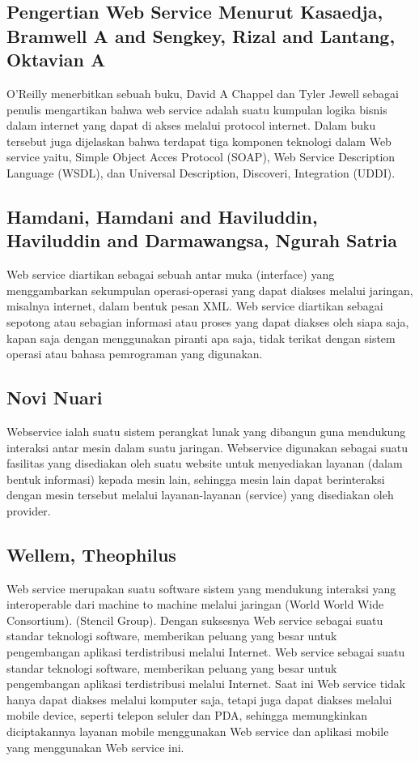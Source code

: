 \documentclass[12pt]{article}
\begin{document}
\subsection{Pengertian Web Service Menurut Kasaedja, Bramwell A and Sengkey, Rizal and Lantang, Oktavian A}

O’Reilly menerbitkan sebuah buku, David A Chappel dan Tyler Jewell sebagai penulis mengartikan bahwa web service adalah suatu kumpulan logika bisnis dalam internet yang dapat di akses melalui protocol internet. Dalam buku tersebut juga dijelaskan bahwa terdapat tiga komponen teknologi dalam Web service yaitu, Simple Object Acces Protocol (SOAP), Web Service Description Language (WSDL), dan Universal Description, Discoveri, Integration (UDDI)\cite{kasaedja2014rancang}.

\subsection{Hamdani, Hamdani and Haviluddin, Haviluddin and Darmawangsa, Ngurah Satria}

Web service diartikan sebagai sebuah antar muka (interface) yang menggambarkan sekumpulan operasi-operasi yang dapat diakses melalui jaringan, misalnya internet, dalam bentuk pesan XML. Web service diartikan sebagai sepotong atau sebagian informasi atau proses yang dapat diakses oleh siapa saja, kapan saja dengan menggunakan piranti apa saja, tidak terikat dengan sistem operasi atau bahasa pemrograman yang digunakan.

\subsection{Novi Nuari}

Webservice ialah suatu sistem perangkat lunak yang dibangun guna mendukung interaksi antar mesin dalam suatu jaringan. Webservice digunakan sebagai suatu fasilitas yang disediakan oleh suatu website untuk menyediakan layanan (dalam bentuk informasi) kepada mesin lain, sehingga mesin lain dapat berinteraksi dengan mesin tersebut melalui layanan-layanan (service) yang disediakan oleh provider\cite{nuari2014perancangan}.

\subsection{Wellem, Theophilus}

Web service merupakan suatu software sistem yang mendukung interaksi yang interoperable dari machine to machine melalui jaringan (World World Wide Consortium).  (Stencil Group). Dengan suksesnya Web service sebagai suatu standar teknologi software, memberikan peluang yang besar untuk pengembangan aplikasi terdistribusi melalui Internet.
Web service sebagai suatu standar teknologi software, memberikan peluang yang besar untuk pengembangan aplikasi terdistribusi melalui Internet. Saat ini Web service tidak hanya dapat diakses melalui komputer saja, tetapi juga dapat diakses melalui mobile device, seperti telepon seluler dan PDA, sehingga memungkinkan diciptakannya layanan mobile menggunakan Web service dan aplikasi mobile yang menggunakan Web service ini\cite{wellem2015perancangan}.
\end{document}
